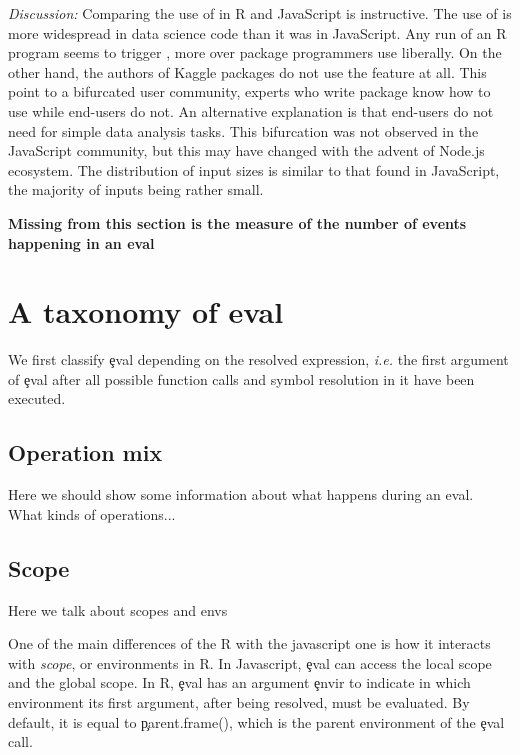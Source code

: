 \documentclass[conference]{IEEEtran}
\begin{document}
\medskip\noindent\emph{Discussion:} Comparing the use of \eval in R and
JavaScript is instructive. The use of \eval is more widespread in data
science code than it was in JavaScript. Any run of an R program seems to
trigger \eval, more over package programmers use \eval liberally. On the
other hand, the authors of Kaggle packages do not use the feature at all.
This point to a bifurcated user community, experts who write package know
how to use \eval while end-users do not. An alternative explanation is that
end-users do not need \eval for simple data analysis tasks. This bifurcation
was not observed in the JavaScript community, but this may have changed with
the advent of Node.js ecosystem.  The distribution of input sizes is similar
to that found in JavaScript, the majority of inputs being rather small.


{\bf Missing from this section is the measure of the number of events
  happening in an eval}

\section{A taxonomy of eval}

We first classify \c{eval} depending on the resolved expression, \emph{i.e.}
the first argument of \c{eval} after all possible function calls and symbol
resolution in it have been executed.

\subsection{Operation mix}

Here we should show some information about what happens during an eval. What kinds of operations...



\subsection{Scope}

Here we talk about scopes and envs

One of the main differences of the R \eval with the javascript one is how it
interacts with \emph{scope}, or environments in R. In Javascript, \c{eval}
can access the local scope and the global scope. In R, \c{eval} has an
argument \c{envir} to indicate in which environment its first argument,
after being resolved, must be evaluated. By default, it is equal to \c{parent.frame()}, which is the parent environment of the \c{eval} call.
\end{document}
